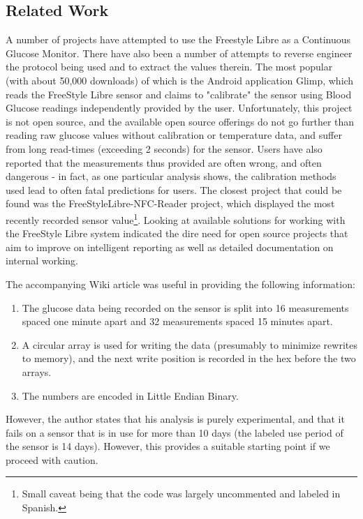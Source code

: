 \subsection{Related Work}

A number of projects have attempted to use the Freestyle Libre as a Continuous Glucose Monitor. There have also been a number of attempts to reverse engineer the protocol being used and to extract the values therein. The most popular (with about 50,000 downloads) of which is the Android application Glimp\cite{software_glimp_2017}, which 	reads the FreeStyle Libre sensor and claims to "calibrate" the sensor using Blood Glucose readings independently provided by the user. Unfortunately, this project is not open source, and the available open source offerings do not go further than reading raw glucose values without calibration or temperature data, and suffer from long read-times (exceeding 2 seconds) for the sensor. Users have also reported that the measurements thus provided are often wrong, and often dangerous - in fact, as one particular analysis shows, the calibration methods used lead to often fatal predictions for users\cite{v_libre_nodate}. The closest project that could be found was the FreeStyleLibre-NFC-Reader\cite{bautista_freestylelibre-nfc-reader:_2017} project, which displayed the most recently recorded sensor value\footnote{Small caveat being that the code was largely uncommented and labeled in Spanish.}. Looking at available solutions for working with the FreeStyle Libre system indicated the dire need for open source projects that aim to improve on intelligent reporting as well as detailed documentation on internal working.

The accompanying Wiki article was useful in providing the following information:

\begin{enumerate}
\item The glucose data being recorded on the sensor is split into 16 measurements spaced one minute apart and 32 measurements spaced 15 minutes apart.
\item A circular array is used for writing the data (presumably to minimize rewrites to memory), and the next write position is recorded in the hex before the two arrays.
\item The numbers are encoded in Little Endian Binary\cite{noauthor_endianness_2017}.
\end{enumerate}

However, the author states that his analysis is purely experimental, and that it fails on a sensor that is in use for more than 10 days (the labeled use period of the sensor is 14 days). However, this provides a suitable starting point if we proceed with caution.

